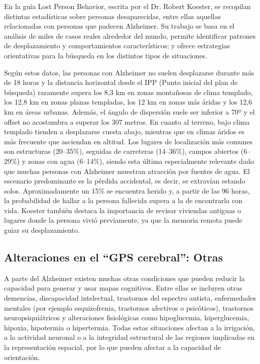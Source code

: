     En la guía Lost Person Behavior\cite{libroLostPersonBehavior,lostPersonBehavior}, escrita por el Dr. Robert Koester, se recopilan distintas estadísticas sobre personas desaparecidas, entre ellas aquellas relacionadas con personas que padecen Alzheimer. Su trabajo se basa en el análisis de miles de casos reales alrededor del mundo, permite identificar patrones de desplazamiento y comportamientos característicos; y ofrece estrategias orientativas para la búsqueda en los distintos tipos de situaciones.
    
    Según estos datos, las personas con Alzheimer no suelen desplazarse durante más de 18 horas y la distancia horizontal desde el IPP (Punto inicial del plan de búsqueda) raramente supera los 8,3 km en zonas montañosas de clima templado, los 12,8 km en zonas planas templadas, los 12 km en zonas más áridas y los 12,6 km en áreas urbanas. Además, el ángulo de dispersión suele ser inferior a 70º y el offset no acostumbra a superar los 307 metros. En cuanto al terreno, bajo clima templado tienden a desplazarse cuesta abajo, mientras que en climas áridos es más frecuente que asciendan en altitud. Los lugares de localización más comunes son estructuras (20–35\%), seguidas de carreteras (14–36\%), campos abiertos (6–29\%) y zonas con agua (6–14\%), siendo esta última especialmente relevante dado que muchas personas con Alzheimer muestran atracción por fuentes de agua. El escenario predominante es la pérdida accidental, es decir, se extravían estando solos. Aproximadamente un 15\% se encuentra herido y, a partir de las 96 horas, la probabilidad de hallar a la persona fallecida supera a la de encontrarla con vida. Koester también destaca la importancia de revisar viviendas antiguas o lugares donde la persona vivió previamente, ya que la memoria remota puede guiar su desplazamiento.



    \subsection{Alteraciones en el ``GPS cerebral'': Otras}

    A parte del Alzheimer existen muchas otras condiciones que pueden reducir la capacidad para generar y usar mapas cognitivos. Entre ellas se incluyen otras demencias, discapacidad intelectual, trastornos del espectro autista, enfermedades mentales (por ejemplo esquizofrenia, trastornos afectivos o psicóticos), trastornos neuropsiquiátricos y alteraciones fisiológicas como hipoglucemia, hiperglucemia, hipoxia, hipotermia o hipertermia. Todas estas situaciones afectan a la irrigación, a la actividad neuronal o a la integridad estructural de las regiones implicadas en la representación espacial, por lo que pueden afectar a la capacidad de orientación.\cite{libroLostPersonBehavior, ManualDeBusquedayRescate}
    

